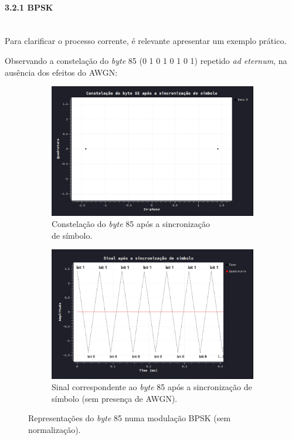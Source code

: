 \clearpage
\paragraph{3.2.1 BPSK}\mbox{}\\
Para clarificar o processo corrente, é relevante apresentar um exemplo prático.

Observando a constelação do \textit{byte} 85 (0 1 0 1 0 1 0 1) repetido \textit{ad eternum}, na ausência dos efeitos do AWGN:
\begin{figure}[H]
    \begin{subfigure}[b]{0.45\linewidth}
        \centering
        \includegraphics[width = 0.8\linewidth]{img/intro/const-byte85-bpsk.png}
        \caption{Constelação do \textit{byte} 85 após a sincronização\\ de símbolo.}
        \label{fig:const-byte85-bpsk}
        \vspace{1ex}
    \end{subfigure}
    \begin{subfigure}[b]{0.45\linewidth}
        \centering
        \includegraphics[width = 0.8\linewidth]{img/intro/detected-byte85-bpsk.png}
        \caption{Sinal correspondente ao \textit{byte} 85 após a sincronização de símbolo (sem presença de AWGN).}
        \label{fig:detected-byte85-bpsk}
        \vspace{1ex}
    \end{subfigure}
    \caption{Representações do \textit{byte} 85 numa modulação BPSK (sem normalização\protect\footnotemark[8]).}
\end{figure}
